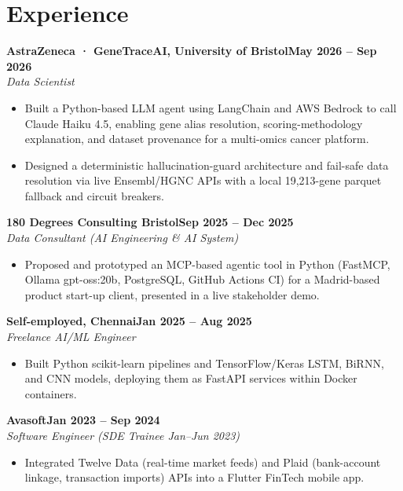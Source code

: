 \documentclass[a4paper,10pt]{article}
\newcommand{\entry}[4]{\noindent\textbf{#1}\hfill\textbf{#2}\\ \textit{#3}\hfill\textit{#4}\par}
\begin{document}
\section{Experience}
\entry{AstraZeneca · GeneTraceAI, University of Bristol}{May 2026 – Sep 2026}{Data Scientist}{}
\begin{itemize}
  \item Built a Python-based LLM agent using LangChain and AWS Bedrock to call Claude Haiku 4.5, enabling gene alias resolution, scoring-methodology explanation, and dataset provenance for a multi-omics cancer platform.
  \item Designed a deterministic hallucination-guard architecture and fail-safe data resolution via live Ensembl/HGNC APIs with a local 19,213-gene parquet fallback and circuit breakers.
\end{itemize}
\vspace{3pt}
\entry{180 Degrees Consulting Bristol}{Sep 2025 – Dec 2025}{Data Consultant (AI Engineering \& AI System)}{}
\begin{itemize}
  \item Proposed and prototyped an MCP-based agentic tool in Python (FastMCP, Ollama gpt-oss:20b, PostgreSQL, GitHub Actions CI) for a Madrid-based product start-up client, presented in a live stakeholder demo.
\end{itemize}
\vspace{3pt}
\entry{Self-employed, Chennai}{Jan 2025 – Aug 2025}{Freelance AI/ML Engineer}{}
\begin{itemize}
  \item Built Python scikit-learn pipelines and TensorFlow/Keras LSTM, BiRNN, and CNN models, deploying them as FastAPI services within Docker containers.
\end{itemize}
\vspace{3pt}
\entry{Avasoft}{Jan 2023 – Sep 2024}{Software Engineer (SDE Trainee Jan–Jun 2023)}{}
\begin{itemize}
  \item Integrated Twelve Data (real-time market feeds) and Plaid (bank-account linkage, transaction imports) APIs into a Flutter FinTech mobile app.
\end{itemize}

\end{document}
